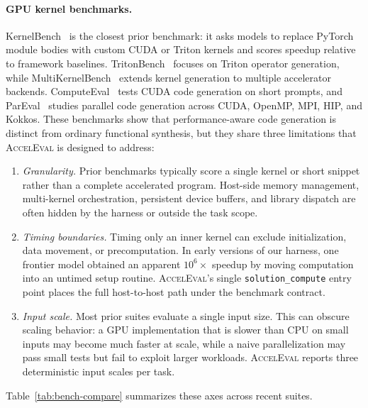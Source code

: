 \documentclass{article}
\begin{document}
\paragraph{GPU kernel benchmarks.}
KernelBench~\citep{kernelbench} is the closest prior benchmark: it asks models to replace PyTorch module bodies with custom CUDA or Triton kernels and scores speedup relative to framework baselines. TritonBench~\citep{tritonbench} focuses on Triton operator generation, while MultiKernelBench~\citep{multikernelbench} extends kernel generation to multiple accelerator backends. ComputeEval~\citep{computeeval} tests CUDA code generation on short prompts, and ParEval~\citep{pareval} studies parallel code generation across CUDA, OpenMP, MPI, HIP, and Kokkos. These benchmarks show that performance-aware code generation is distinct from ordinary functional synthesis, but they share three limitations that \textsc{AccelEval} is designed to address:

\begin{enumerate}
  \item \emph{Granularity.} Prior benchmarks typically score a single kernel or short snippet rather than a complete accelerated program. Host-side memory management, multi-kernel orchestration, persistent device buffers, and library dispatch are often hidden by the harness or outside the task scope.
  \item \emph{Timing boundaries.} Timing only an inner kernel can exclude initialization, data movement, or precomputation. In early versions of our harness, one frontier model obtained an apparent $10^{6}\times$ speedup by moving computation into an untimed setup routine. \textsc{AccelEval}'s single \texttt{solution\_compute} entry point places the full host-to-host path under the benchmark contract.
  \item \emph{Input scale.} Most prior suites evaluate a single input size. This can obscure scaling behavior: a GPU implementation that is slower than CPU on small inputs may become much faster at scale, while a naive parallelization may pass small tests but fail to exploit larger workloads. \textsc{AccelEval} reports three deterministic input scales per task.
\end{enumerate}

Table~\ref{tab:bench-compare} summarizes these axes across recent suites.
\end{document}
